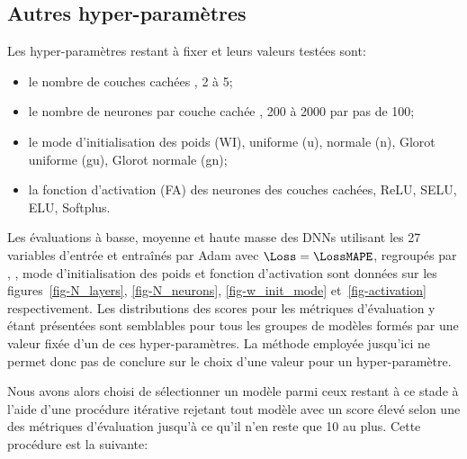\subsection{Autres hyper-paramètres}\label{chapter-ML-section-hyperparameters-others}
Les hyper-paramètres restant à fixer et leurs valeurs testées sont:
\begin{itemize}
\item le nombre de couches cachées \NLayers, 2 à 5;
\item le nombre de neurones par couche cachée \NNeurons, \num{200} à \num{2000} par pas de \num{100};
\item le mode d'initialisation des poids (WI), uniforme (u), normale (n), Glorot uniforme (gu), Glorot normale (gn);
\item la fonction d'activation (FA) des neurones des couches cachées, ReLU, SELU, ELU, Softplus.
\end{itemize}
Les évaluations
à basse, moyenne et haute masse
des DNNs
utilisant les 27 variables d'entrée
et
entraînés par Adam avec $\Loss=\LossMAPE$,
regroupés par
\NLayers, \NNeurons, mode d'initialisation des poids et fonction d'activation
sont données sur les
figures~\ref{fig-N_layers}, \ref{fig-N_neurons}, \ref{fig-w_init_mode} et~\ref{fig-activation} respectivement.
Les distributions des scores pour les métriques d'évaluation y étant présentées
sont semblables pour tous les groupes de modèles formés par
une valeur fixée d'un de ces hyper-paramètres.
La méthode employée jusqu'ici ne permet donc pas de conclure sur le choix d'une valeur pour un hyper-paramètre.
\def\localHP{N_layers}
\def\localHPlong{\NLayers}

\def\localHP{N_neurons}
\def\localHPlong{\NNeurons}

\def\localHP{w_init_mode}
\def\localHPlong{le mode d'initialisation des poids}

\def\localHP{activation}
\def\localHPlong{la fonction d'activation}

\par
Nous avons alors choisi
de sélectionner un modèle
parmi ceux restant à ce stade
à l'aide d'une procédure itérative
rejetant tout modèle avec un score élevé selon une des métriques d'évaluation
jusqu'à ce qu'il n'en reste que 10 au plus.
Cette procédure est la suivante:

